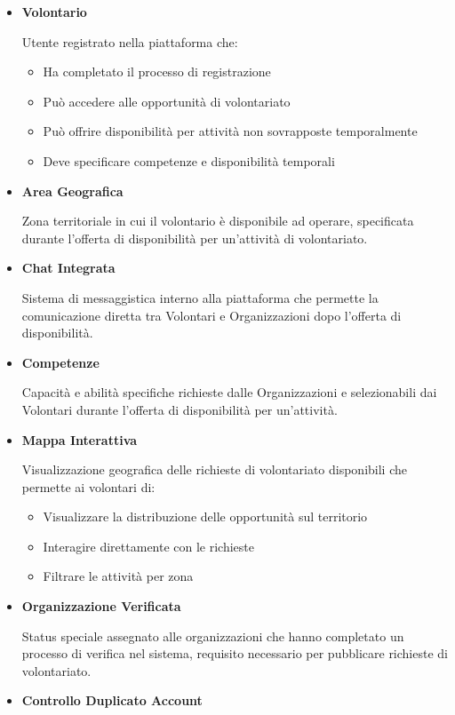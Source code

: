 \begin{itemize}
\item \textbf{Volontario}

Utente registrato nella piattaforma che:
\begin{itemize}
    \item Ha completato il processo di registrazione
    \item Può accedere alle opportunità di volontariato
    \item Può offrire disponibilità per attività non sovrapposte temporalmente
    \item Deve specificare competenze e disponibilità temporali
\end{itemize}

\item \textbf{Area Geografica}

Zona territoriale in cui il volontario è disponibile ad operare, specificata durante l'offerta di disponibilità per un'attività di volontariato.

\item \textbf{Chat Integrata}

Sistema di messaggistica interno alla piattaforma che permette la comunicazione diretta tra Volontari e Organizzazioni dopo l'offerta di disponibilità.

\item \textbf{Competenze}

Capacità e abilità specifiche richieste dalle Organizzazioni e selezionabili dai Volontari durante l'offerta di disponibilità per un'attività.

\item \textbf{Mappa Interattiva}

Visualizzazione geografica delle richieste di volontariato disponibili che permette ai volontari di:
\begin{itemize}
    \item Visualizzare la distribuzione delle opportunità sul territorio
    \item Interagire direttamente con le richieste
    \item Filtrare le attività per zona
\end{itemize}

\item \textbf{Organizzazione Verificata}

Status speciale assegnato alle organizzazioni che hanno completato un processo di verifica nel sistema, requisito necessario per pubblicare richieste di volontariato.

\item \textbf{Controllo Duplicato Account}


\end{itemize}
